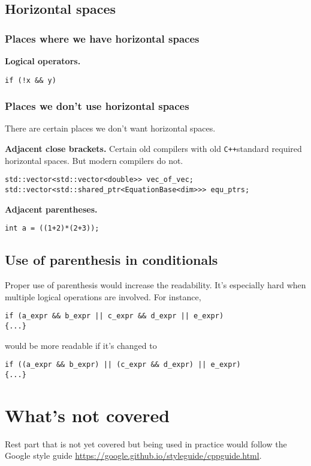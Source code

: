 \documentclass[openany]{book}
\newcommand{\cpp}{{\tt C++}}
\begin{document}
\subsection{Horizontal spaces}
\subsubsection{Places where we have horizontal spaces}
{\bf Logical operators.}
\begin{lstlisting}
if (!x && y)
\end{lstlisting}

\subsubsection{Places we don't use horizontal spaces}
There are certain places we don't want horizontal spaces. 

{\bf Adjacent close brackets.} Certain old compilers with old \cpp standard required horizontal spaces. But modern compilers do not.
\begin{lstlisting}
std::vector<std::vector<double>> vec_of_vec;
std::vector<std::shared_ptr<EquationBase<dim>>> equ_ptrs;
\end{lstlisting}

{\bf Adjacent parentheses.}
\begin{lstlisting}
int a = ((1+2)*(2+3));
\end{lstlisting}

\subsection{Use of parenthesis in conditionals}
Proper use of parenthesis would increase the readability. It's especially hard when multiple logical operations are involved. For instance,
\begin{lstlisting}
if (a_expr && b_expr || c_expr && d_expr || e_expr)
{...}
\end{lstlisting}
would be more readable if it's changed to
\begin{lstlisting}
if ((a_expr && b_expr) || (c_expr && d_expr) || e_expr)
{...}
\end{lstlisting}
\section{What's not covered}
Rest part that is not yet covered but being used in practice would follow the Google style guide \url{https://google.github.io/styleguide/cppguide.html}.
\end{document}
